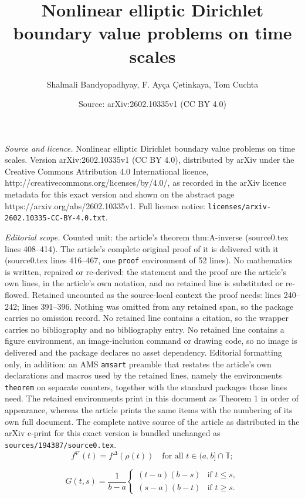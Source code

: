 \documentclass[10pt,a4paper]{amsart}
\title{Nonlinear elliptic Dirichlet boundary value problems on time scales}
\author{Shalmali Bandyopadhyay, F. Ay\c{c}a \c{C}etinkaya, Tom Cuchta}
\date{Source: arXiv:2602.10335v1 (CC BY 4.0)}
\begin{document}
\maketitle

\noindent\emph{Source and licence.} Nonlinear elliptic Dirichlet boundary value problems on time scales. Version arXiv:2602.10335v1 (CC BY 4.0), distributed by arXiv under the Creative Commons Attribution 4.0 International licence, http://creativecommons.org/licenses/by/4.0/, as recorded in the arXiv licence metadata for this exact version and shown on the abstract page https://arxiv.org/abs/2602.10335v1. Full licence notice: \texttt{licenses/arxiv-2602.10335-CC-BY-4.0.txt}.\par\smallskip

\noindent\textit{Editorial scope.} Counted unit: the article's theorem thm:A-inverse (source0.tex lines 408--414). The article's complete original proof of it is delivered with it (source0.tex lines 416--467, one \texttt{proof} environment of 52 lines). No mathematics is written, repaired or re-derived: the statement and the proof are the article's own lines, in the article's own notation, and no retained line is substituted or re-flowed.  Retained uncounted as the source-local context the proof needs: lines 240--242; lines 391--396.  Nothing was omitted from any retained span, so the package carries no omission record.  No retained line contains a citation, so the wrapper carries no bibliography and no bibliography entry.  No retained line contains a figure environment, an image-inclusion command or drawing code, so no image is delivered and the package declares no asset dependency.  Editorial formatting only, in addition: an AMS \texttt{amsart} preamble that restates the article's own declarations and macros used by the retained lines, namely the environments \texttt{theorem} on separate counters, together with the standard packages those lines need.  The retained environments print in this document as Theorem 1 in order of appearance, whereas the article prints the same items with the numbering of its own full document.  The complete native source of the article as distributed in the arXiv e-print for this exact version is bundled unchanged as \texttt{sources/194387/source0.tex}.
\begin{equation}\label{eq:nabla-from-delta}
f^\nabla(t) = f^\Delta(\rho(t)) \quad \text{for all } t \in (a,b]\cap\mathbb{T};
\end{equation}

\begin{equation}\label{eq:Green-1D}
G(t,s) = \frac{1}{b-a} \begin{cases}
(t-a)(b-s) & \text{if } t \leq s,\\
(s-a)(b-t) & \text{if } t \geq s.
\end{cases}
\end{equation}
\end{document}
